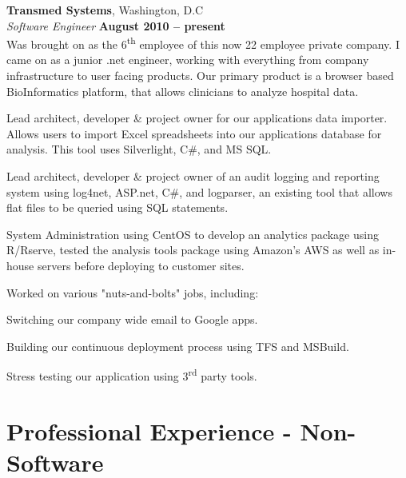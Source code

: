 \documentclass[margin,line]{resume}
\begin{document}
\begin{resume}
    \textbf{Transmed Systems}, Washington, D.C \vspace{1mm}\\\vspace{1mm}%
    \textsl{Software Engineer} \hfill \textbf{August 2010 -- present}\vspace{1mm}\\\vspace{0mm}%
	Was brought on as the 6\textsuperscript{th} employee of this now 22 employee private company. I came on as a junior .net engineer, working with everything from company infrastructure to user facing products. Our primary product is a browser based BioInformatics platform, that allows clinicians to analyze hospital data.
\vspace{-3mm}\\\vspace{1mm}
    \begin{list2}
    \item Lead architect, developer \& project owner for our applications data importer. Allows users to import Excel spreadsheets into our applications database for analysis. This tool uses Silverlight, C\#, and MS SQL.
    \item Lead architect, developer \& project owner of an audit logging and reporting system using log4net, ASP.net, C\#, and logparser, an existing tool that allows flat files to be queried using SQL statements.
    \item System Administration using CentOS to develop an analytics package using R/Rserve, tested the analysis tools package using Amazon's AWS as well as in-house servers before deploying to customer sites.
  \end{list2}
Worked on various "nuts-and-bolts" jobs, including:
\begin{list2}
    \item Switching our company wide email to Google apps.
    \item Building our continuous deployment process using TFS and MSBuild.
    \item Stress testing our application using 3\textsuperscript{rd} party tools.
  \end{list2}
	
 \section{\mysidestyle Professional Experience - Non-Software}
   

\end{resume}
\end{document}
